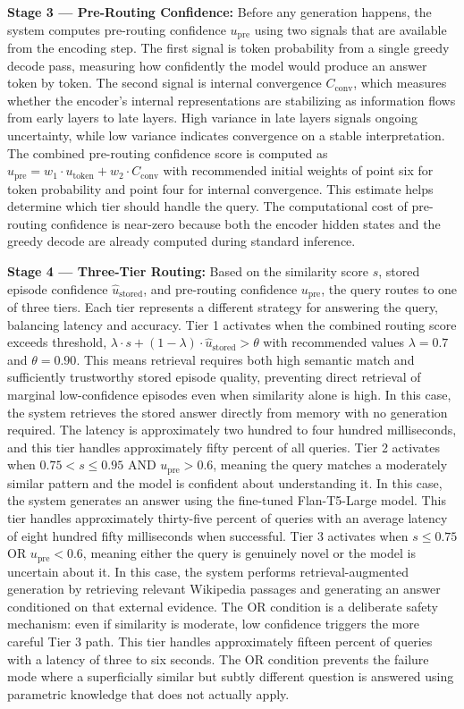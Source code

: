 \documentclass[11pt,a4paper]{article}
\newcommand{\Cconv}{C_{\text{conv}}}
\newcommand{\upre}{u_{\text{pre}}}
\newcommand{\ustored}{\hat{u}_{\text{stored}}}
\begin{document}
\textbf{Stage 3 — Pre-Routing Confidence:} Before any generation happens, the system computes pre-routing confidence $\upre$ using two signals that are available from the encoding step. The first signal is token probability from a single greedy decode pass, measuring how confidently the model would produce an answer token by token. The second signal is internal convergence $\Cconv$, which measures whether the encoder's internal representations are stabilizing as information flows from early layers to late layers. High variance in late layers signals ongoing uncertainty, while low variance indicates convergence on a stable interpretation. The combined pre-routing confidence score is computed as $\upre = w_1 \cdot u_{\text{token}} + w_2 \cdot \Cconv$ with recommended initial weights of point six for token probability and point four for internal convergence. This estimate helps determine which tier should handle the query. The computational cost of pre-routing confidence is near-zero because both the encoder hidden states and the greedy decode are already computed during standard inference.

\textbf{Stage 4 — Three-Tier Routing:} Based on the similarity score $s$, stored episode confidence $\ustored$, and pre-routing confidence $\upre$, the query routes to one of three tiers. Each tier represents a different strategy for answering the query, balancing latency and accuracy. Tier 1 activates when the combined routing score exceeds threshold, $\lambda \cdot s + (1-\lambda) \cdot \ustored > \theta$ with recommended values $\lambda = 0.7$ and $\theta = 0.90$. This means retrieval requires both high semantic match and sufficiently trustworthy stored episode quality, preventing direct retrieval of marginal low-confidence episodes even when similarity alone is high. In this case, the system retrieves the stored answer directly from memory with no generation required. The latency is approximately two hundred to four hundred milliseconds, and this tier handles approximately fifty percent of all queries. Tier 2 activates when $0.75 < s \leq 0.95$ AND $\upre > 0.6$, meaning the query matches a moderately similar pattern and the model is confident about understanding it. In this case, the system generates an answer using the fine-tuned Flan-T5-Large model. This tier handles approximately thirty-five percent of queries with an average latency of eight hundred fifty milliseconds when successful. Tier 3 activates when $s \leq 0.75$ OR $\upre < 0.6$, meaning either the query is genuinely novel or the model is uncertain about it. In this case, the system performs retrieval-augmented generation by retrieving relevant Wikipedia passages and generating an answer conditioned on that external evidence. The OR condition is a deliberate safety mechanism: even if similarity is moderate, low confidence triggers the more careful Tier 3 path. This tier handles approximately fifteen percent of queries with a latency of three to six seconds. The OR condition prevents the failure mode where a superficially similar but subtly different question is answered using parametric knowledge that does not actually apply.
\end{document}
